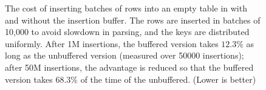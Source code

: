 \begin{figure}
\begin{subfigure}{0.49\linewidth}
   \end{subfigure}
	\caption{The cost of inserting batches of rows into an empty
          table in \innodb{} with and without the insertion
          buffer. The rows are inserted in batches of 10,000 to avoid
          slowdown in parsing, and the keys are distributed
          uniformly. After 1M insertions, the buffered version takes
          $12.3\%$ as long as the unbuffered version (measured over
          50000 insertions); after 50M insertions, the advantage is
          reduced so that the buffered version takes $68.3\%$ of
          the time of the unbuffered. (Lower is better)} \label{fig:introbuffer}
\end{figure}
